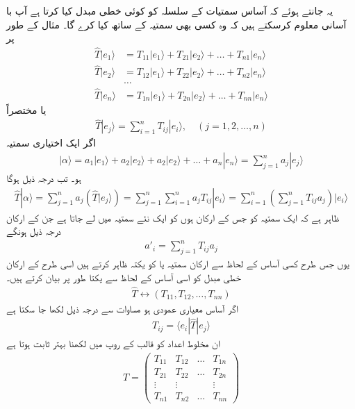 یہ جانتے ہوئے کہ آساس سمتیات کے سلسلہ کو کوئی خطی مبدل کیا کرتا ہے آپ با آسانی معلوم کرسکتے ہیں کہ وہ کسی بھی سمتیہ کے ساتھ کیا کرے گا۔ مثال کے طور پر 
\begin{align*}
	\hat{T}|e_1\rangle &= T_{11}|e_1\rangle+T_{21}|e_2\rangle+\dots+T_{n1}|e_n\rangle\\
	\hat{T}|e_2\rangle &= T_{12}|e_1\rangle+T_{22}|e_2\rangle+\dots+T_{n2}|e_n\rangle\\
	&\dots\\
	\hat{T}|e_n\rangle &= T_{1n}|e_1\rangle+T_{2n}|e_2\rangle+\dots+T_{nn}|e_n\rangle
\end{align*}
یا مختصراً
\begin{align}
	\hat{T}|e_{j}\rangle=\sum_{i=1}^{n}T_{ij}|e_i\rangle,\quad(j=1, 2, \dots, n)
\end{align}
اگر  ایک اختیاری سمتیہ 
\begin{align}
	|\alpha\rangle=a_1|e_1\rangle+a_2|e_2\rangle+a_2|e_2\rangle+\dots+a_n|e_n\rangle=\sum_{j=1}^{n}a_j|e_j\rangle
\end{align}
ہو۔ تب درجہ ذیل ہوگا
\begin{align}
	\hat{T}|\alpha\rangle=\sum_{j=1}^{n}a_j\left(\hat{T}|e_j\rangle\right)=\sum_{j=1}^{n}\sum_{i=1}^{n}a_jT_{ij}|e_i\rangle=\sum_{i=1}^{n}\left(\sum_{j=1}^{n}T_{ij}a_j\right)|e_i\rangle
\end{align}
ظاہر ہے کہ  ایک سمتیہ کو جس کے ارکان  ہوں کو ایک نئے سمتیہ میں لے جاتا ہے جن کے ارکان درجہ ذیل ہونگے
\begin{align}
	a'_i=\sum_{j=1}^{n}T_{ij}a_j
\end{align}
یوں جس طرح کسی آساس کے لحاظ سے  ارکان  سمتیہ یا  کو یکتہ ظاہر کرتے ہیں اسی طرح  کے  ارکان خطی مبدل  کو اسی آساس کے لحاظ سے یکتا طور پر بیان کرتے ہیں۔
\begin{align}
	\hat{T}\leftrightarrow(T_{11}, T_{12}, \dots, T_{nn})
\end{align}
اگر آساس معیاری عمودی ہو  مساوات  سے درجہ ذیل لکھا جا سکتا ہے
\begin{align}
	T_{ij}=\langle e_i|\hat{T}|e_j\rangle
\end{align}
ان مخلوط اعداد کو قالب کے روپ میں لکھنا بہتر ثابت ہوتا ہے 
\begin{align}
	T=
	\begin{pmatrix}
		T_{11} & T_{12} & \dots & T_{1n}\\
		T_{21} & T_{22} & \dots & T_{2n}\\
		\vdots & \vdots & & \vdots\\
		T_{n1} & T_{n2} & \dots & T_{nn}
	\end{pmatrix}
\end{align}
